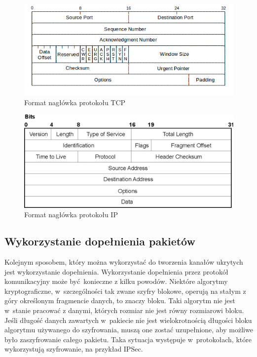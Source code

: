 \documentclass[a4paper, twoside, 12pt]{report}
\begin{document}
        \begin{figure}[h]
                \centering
                \includegraphics{tcp_header}
                \caption{Format nagłówka protokołu TCP}
                \label{TCPHEADER}
        \end{figure}
        \begin{figure}[h]
                \centering
                \includegraphics{ip_header}
                \caption{Format nagłówka protokołu IP}
                \label{IPHEADER}
        \end{figure}
        \subsection{Wykorzystanie dopełnienia pakietów}
        Kolejnym sposobem, który można wykorzystać do tworzenia kanałów ukrytych
        jest wykorzystanie dopełnienia. Wykorzystanie dopełnienia przez protokół komunikacyjny
        może być konieczne z kilku powodów. Niektóre algorytmy kryptograficzne, w~szczególności
        tak zwane szyfry blokowe, operują na stałym z góry określonym fragmencie danych,
        to znaczy bloku. Taki algorytm nie jest w~stanie pracować z danymi, których
        rozmiar nie jest równy rozmiarowi bloku. Jeśli długość
        danych zawartych w~pakiecie nie jest wielokrotnością długości bloku
        algorytmu używanego do szyfrowania, muszą one zostać uzupełnione, aby możliwe
        było zaszyfrowanie całego pakietu. Taka sytuacja występuje w~protokołach,
        które wykorzystują szyfrowanie, na przykład IPSec\cite{IPSECPADDING}.
\end{document}
